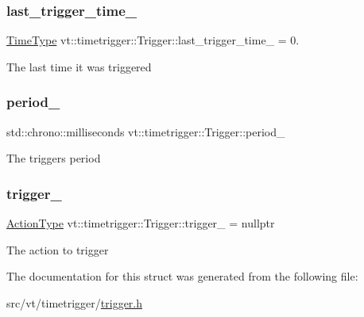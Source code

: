 \subsubsection{\texorpdfstring{last\+\_\+trigger\+\_\+time\+\_\+}{last\_trigger\_time\_}}
{\footnotesize\ttfamily \hyperlink{namespacevt_a876a9d0cd5a952859c72de8a46881442}{Time\+Type} vt\+::timetrigger\+::\+Trigger\+::last\+\_\+trigger\+\_\+time\+\_\+ = 0.\hspace{0.3cm}{\ttfamily [private]}}

The last time it was triggered \mbox{\label{structvt_1_1timetrigger_1_1_trigger_aa95009a5d9a17ffdb84b5317a7a5dfc2}} 
\subsubsection{\texorpdfstring{period\+\_\+}{period\_}}
{\footnotesize\ttfamily std\+::chrono\+::milliseconds vt\+::timetrigger\+::\+Trigger\+::period\+\_\+\hspace{0.3cm}{\ttfamily [private]}}

The trigger\textquotesingle{}s period \mbox{\label{structvt_1_1timetrigger_1_1_trigger_ac1d93e6fff9b0faa8889198e481d50d4}} 
\subsubsection{\texorpdfstring{trigger\+\_\+}{trigger\_}}
{\footnotesize\ttfamily \hyperlink{namespacevt_ae0a5a7b18cc99d7b732cb4d44f46b0f3}{Action\+Type} vt\+::timetrigger\+::\+Trigger\+::trigger\+\_\+ = nullptr\hspace{0.3cm}{\ttfamily [private]}}

The action to trigger 

The documentation for this struct was generated from the following file\+:\begin{DoxyCompactItemize}
\item 
src/vt/timetrigger/\hyperlink{trigger_8h}{trigger.\+h}\end{DoxyCompactItemize}
